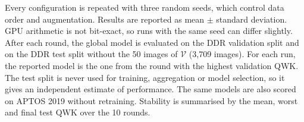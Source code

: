 Every configuration is repeated with three random seeds, which control data order
and augmentation. Results are reported as mean $\pm$ standard deviation. GPU
arithmetic is not bit-exact, so runs with the same seed can differ slightly. After
each round, the global model is evaluated on the DDR validation split and on the
DDR test split without the 50 images of $\mathcal{V}$ (3,709 images). For each run,
the reported model is the one from the round with the highest validation QWK. The
test split is never used for training, aggregation or model selection, so it gives
an independent estimate of performance. The same models are also scored on APTOS
2019 without retraining. Stability is summarised by the mean, worst and final test
QWK over the 10 rounds.
